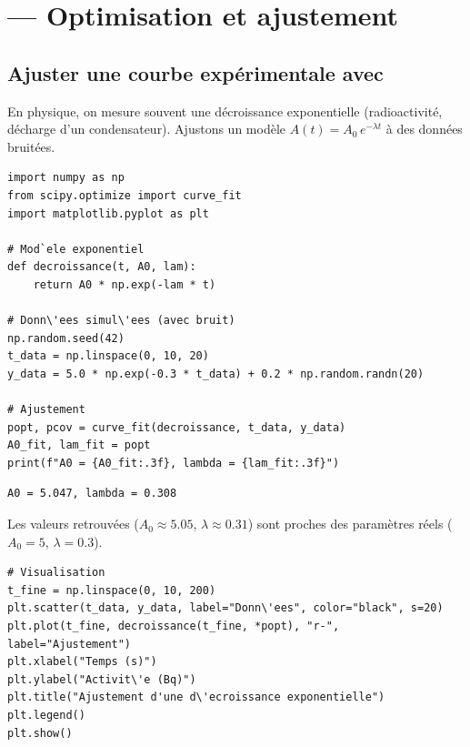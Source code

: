 \section{ --- Optimisation et ajustement}

\subsection{Ajuster une courbe exp\'erimentale avec }

En physique, on mesure souvent une d\'ecroissance exponentielle (radioactivit\'e,
d\'echarge d'un condensateur). Ajustons un mod\`ele $A(t) = A_0 \, e^{-\lambda t}$
\`a des donn\'ees bruit\'ees.

\begin{codeblock}[title=\textbf{Python}]
\begin{verbatim}
import numpy as np
from scipy.optimize import curve_fit
import matplotlib.pyplot as plt

# Mod`ele exponentiel
def decroissance(t, A0, lam):
    return A0 * np.exp(-lam * t)

# Donn\'ees simul\'ees (avec bruit)
np.random.seed(42)
t_data = np.linspace(0, 10, 20)
y_data = 5.0 * np.exp(-0.3 * t_data) + 0.2 * np.random.randn(20)

# Ajustement
popt, pcov = curve_fit(decroissance, t_data, y_data)
A0_fit, lam_fit = popt
print(f"A0 = {A0_fit:.3f}, lambda = {lam_fit:.3f}")
\end{verbatim}
\end{codeblock}

\begin{codeoutput}
\begin{verbatim}
A0 = 5.047, lambda = 0.308
\end{verbatim}
\end{codeoutput}

Les valeurs retrouv\'ees ($A_0 \approx 5.05$, $\lambda \approx 0.31$) sont proches
des param\`etres r\'eels ($A_0 = 5$, $\lambda = 0.3$).

\begin{codeblock}[title=\textbf{Python}]
\begin{verbatim}
# Visualisation
t_fine = np.linspace(0, 10, 200)
plt.scatter(t_data, y_data, label="Donn\'ees", color="black", s=20)
plt.plot(t_fine, decroissance(t_fine, *popt), "r-", label="Ajustement")
plt.xlabel("Temps (s)")
plt.ylabel("Activit\'e (Bq)")
plt.title("Ajustement d'une d\'ecroissance exponentielle")
plt.legend()
plt.show()
\end{verbatim}
\end{codeblock}

